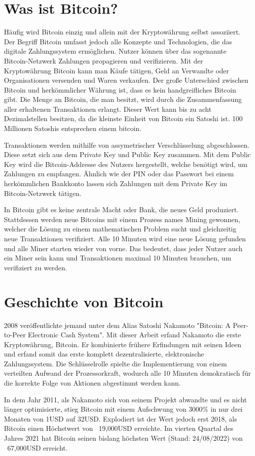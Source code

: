 \section{Was ist Bitcoin?}
Häufig wird Bitcoin einzig und allein mit der Kryptowährung selbst assoziiert. Der Begriff Bitcoin umfasst jedoch alle 
Konzepte und Technologien, die das digitale Zahlungssystem ermöglichen. Nutzer können über das sogenannte Bitcoin-Netzwerk 
Zahlungen propagieren und verifizieren. Mit der Kryptowährung Bitcoin kann man Käufe tätigen, Geld an Verwandte oder
Organisationen versenden und Waren verkaufen. Der große Unterschied zwischen Bitcoin und herkömmlicher Währung ist, dass es 
kein handgreifliches Bitcoin gibt. Die Menge an Bitcoin, die man besitzt, wird durch die Zusammenfassung aller erhaltenen 
Transaktionen erlangt. Dieser Wert kann bis zu acht Dezimalstellen besitzen, da die kleinste Einheit von Bitcoin ein Satoshi
ist. 100 Millionen Satoshis entsprechen einem bitcoin.

Transaktionen werden mithilfe von assymetrischer Verschlüsselung abgeschlossen. Diese setzt sich aus dem Private Key und Public
Key zusammen. Mit dem Public Key wird die Bitcoin-Addresse des Nutzers hergestellt, welche benötigt wird, um Zahlungen zu
empfangen. Ähnlich wie der PIN oder das Passwort bei einem herkömmlichen Bankkonto lassen sich Zahlungen mit dem Private Key
im Bitcoin-Netzwerk tätigen.

In Bitcoin gibt es keine zentrale Macht oder Bank, die neues Geld produziert. Stattdessen werden neue Bitcoins mit einem Prozess
names Mining gewonnen, welcher die Lösung zu einem mathematischen Problem sucht und gleichzeitig neue Transaktionen verifiziert.
Alle 10 Minuten wird eine neue Lösung gefunden und alle Miner starten wieder von vorne. Das bedeutet, dass jeder Nutzer auch ein
Miner sein kann und Transaktionen maximal 10 Minuten brauchen, um verifiziert zu werden.


\section{Geschichte von Bitcoin}
2008 veröffentlichte jemand unter dem Alias Satoshi Nakamoto "Bitcoin: A Peer-to-Peer Electronic Cash System". Mit dieser Arbeit
erfand Nakamoto die erste Kryptowährung, Bitcoin. Er kombinierte frühere Erfindungen mit seinen Ideen und erfand somit das erste
komplett dezentralisierte, elektronische Zahlungssystem. Die Schlüsselrolle spielte die Implementierung von einem verteilten
Aufwand der Prozessorkraft, wodurch alle 10 Minuten demokratisch für die korrekte Folge von Aktionen abgestimmt werden kann.

In dem Jahr 2011, als Nakamoto sich von seinem Projekt abwandte und es nicht länger optimisierte, stieg Bitcoin mit einem
Aufschwung von 3000\% in nur drei Monaten von 1USD auf 32USD. Explodiert ist der Wert jedoch erst 2018, als Bitcoin einen
Höchstwert von ~19,000USD erreichte. Im vierten Quartal des Jahres 2021 hat Bitcoin seinen bislang höchsten Wert (Stand: 24/08/2022)
von ~67,000USD erreicht.